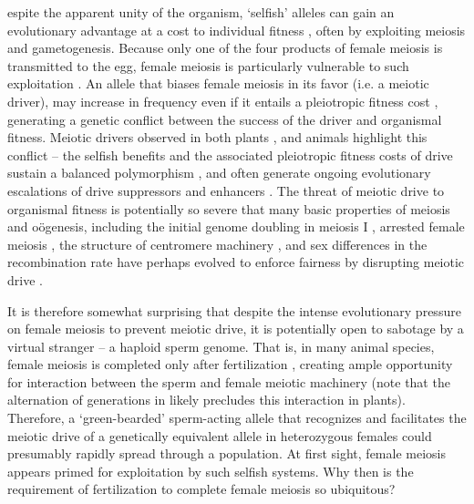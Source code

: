 \documentclass{pnastwo}
\begin{document}
\begin{article}
espite the apparent unity of the organism, `selfish' alleles can
gain an evolutionary advantage at a cost to  individual fitness
\cite{Burt2006}, often by exploiting meiosis and gametogenesis.
Because only one of the four products of female meiosis is transmitted to the egg, female meiosis is particularly vulnerable to such exploitation \cite{Sandler1957,Pardo-ManuelDeVillena2001a}. 
An allele that biases female meiosis in its favor (i.e. a meiotic driver), may increase in frequency even if it entails a pleiotropic fitness cost \cite{Prout1973}, generating a genetic conflict between the success of the driver and organismal fitness.
Meiotic drivers observed in both plants
\cite{Buckler1999,Fishman2005,Fishman2008}, and animals
\cite{Agulnik1990,Wu2005,Pardo-ManuelDeVillena2001c} highlight this
conflict -- the selfish benefits and the associated
pleiotropic fitness costs of drive sustain a balanced polymorphism
\cite{Prout1973}, 
and often generate ongoing evolutionary escalations of drive suppressors and enhancers \cite{Dawe1996,Fishman2008}. 
The threat of meiotic drive to organismal fitness is potentially so
severe that many basic properties of
meiosis and o\"{o}genesis, including the initial genome doubling in
meiosis I \cite{Haig1991}, arrested female meiosis
\cite{Mira1998}, the structure of centromere machinery \cite{Malik2002a,Malik2009}, and sex differences in the recombination rate \cite{Haig2010,Brandvain2012} 
have perhaps evolved to enforce fairness by disrupting meiotic drive \cite{Rice2013}.




It is therefore somewhat surprising that despite the intense evolutionary pressure on female meiosis to prevent meiotic drive, 
it is potentially open to sabotage by a virtual stranger -- a haploid sperm genome.
That is, in many animal species, female meiosis is completed only after fertilization \cite{Masui_book}, 
	creating ample opportunity for interaction between the sperm and
	female meiotic machinery (note that the alternation of generations in
	likely precludes this interaction in plants). 
Therefore, a `green-bearded' \cite{Gardner2010} sperm-acting allele that recognizes and facilitates the meiotic drive of a genetically equivalent allele in heterozygous females %
     could presumably rapidly spread through a population. 
At first sight, female meiosis appears primed for exploitation by such selfish systems.  
Why then is the requirement of fertilization to complete female meiosis so ubiquitous? 


\end{article}
\end{document}
